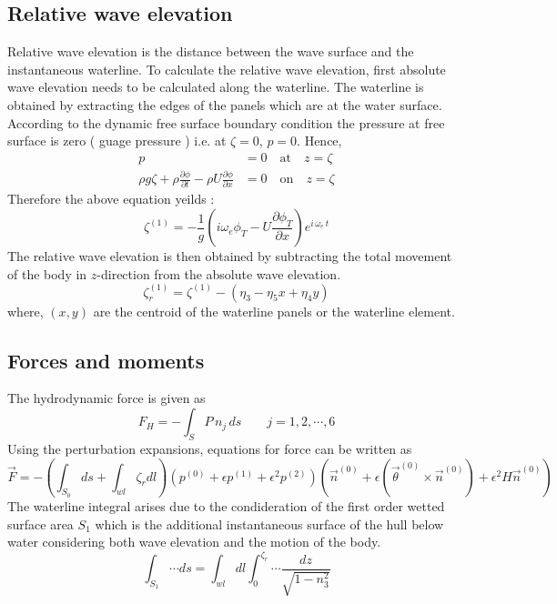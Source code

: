 \subsection{Relative wave elevation}
Relative wave elevation is the distance between the wave surface and the instantaneous waterline. To calculate the
relative wave elevation, first absolute wave elevation needs to be calculated along the waterline. The waterline is obtained 
by extracting the edges of the panels which are at the water surface. According to the dynamic free surface boundary 
condition the pressure at free surface is zero ( guage pressure ) i.e. at $\zeta=0$, $p=0$. Hence, 
\begin{align}
    p &= 0 \quad \text{at} \quad z=\zeta \\ \nonumber
    \rho g \zeta + \rho\frac{\partial \phi}{\partial t} - \rho U \frac{\partial \phi}{\partial x} &=0 \quad \text{on} \quad z=\zeta 
\end{align}
Therefore the above equation yeilds :
\begin{equation}
    \zeta^{(1)} = -\frac{1}{g}\left(i\omega_e \phi_T - U\frac{\partial \phi_T}{\partial x}\right) e^{i\,\omega_e\,t}
\end{equation}
The relative wave elevation is  then obtained by subtracting the total movement of the body in $z$-direction from the
absolute wave elevation.
\begin{equation}
    \zeta^{(1)}_r =\zeta^{(1)} - (\eta_3 - \eta_5x + \eta_4y)
\end{equation}
where, $(x, y)$ are the centroid of the waterline panels or the waterline element.


\subsection{Forces and moments}
The hydrodynamic force is given as 
\begin{equation}
    F_H = -\int_S P\,n_j\,ds \quad \quad j=1, 2,\cdots, 6
\end{equation}
Using the perturbation expansions, equations for force can be written as
\begin{equation}
    \label{eq:per_force}
    \vec{F} = -\left(\int_{S_0}ds+\int_{wl}\zeta_r dl\right)(p^{(0)} + \epsilon p^{(1)} +
    \epsilon^2 p^{(2)}) (\vec{n}^{(0)}+\epsilon(\vec{\theta}^{(0)} \times \vec{n}^{(0)})+\epsilon^2H\vec{n}^{(0)})
\end{equation} 
The waterline integral arises due to the condideration of the first order wetted surface 
area $S_1$ which is the additional instantaneous surface of the hull below water considering 
both wave elevation and the motion of the body.
\begin{equation}
    \int_{S_1}\cdots ds = \int_{wl} dl \int_{0}^{\zeta_r}\cdots \frac{dz}{\sqrt{1-n^2_3}}
\end{equation}


